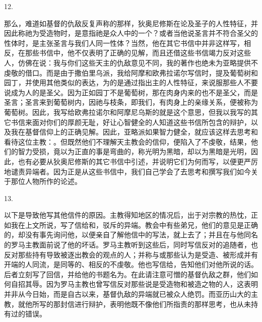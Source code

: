 12. \par

那么，难道如基督的仇敌反复声称的那样，狄奥尼修斯在论及圣子的人性特征，并因此称祂为受造物时，是意指祂是众人中的一个？或者当他说圣言并不符合圣父的性体时，是主张圣言与我们人同一性体？当然，他在其它书信中并非这样写，相反，在那些书信中，他不仅表明了正确的见解，而且还借这些书信竭力反对这些人，仿佛在说：我与你们这些天主的仇敌意见不同，我的著作也绝未为亚略提供不虔敬的借口。而是由于撒伯里乌派，我给阿摩和欧弗拉诺尔写信时，提及葡萄树和园丁，并使用其他类似的表达，为的是通过指出主的人性特征，来说服那些人不要说成为人的是圣父。因为正如园丁不是葡萄树，那在肉身内来的也不是圣父，而是圣言；圣言来到葡萄树内，因祂与枝条，即我们，有肉身上的亲缘关系，便被称为葡萄树。因此，我写给欧弗拉诺尔和阿摩尼乌斯的就是这个意思，但我以我写的其它书信来面对你们的厚颜无耻，好让心智健全的人知道这些书信所包含的辩护，以及我在基督信仰上的正确见解。因此，亚略派如果智力健全，就应该这样去思考和看待这位主教：。但既然他们不理解天主教会的信仰，便陷入了不虔敬，结果，他们的智力受损，竟以为正直的事是弯曲的，称光明为黑暗，却以为黑暗是光明，因此，也有必要从狄奥尼修斯的其它书信中引述，并说明它们为何而写，以便更严厉地谴责异端者。因为正是从这些书信中，我们自己学会了去思考和撰写我们如今关于那位人物所作的论述。\par

13. \par

以下是导致他写其他信件的原因。主教得知地区的情况后，出于对宗教的热忱，正如我在上文所说，写了信给和，驳斥的异端。教会中有些弟兄，他们的意见是正确的，却没有事先询问他，以便亲自了解他信中的写法，就上去了；并且在与他同名的罗马主教面前说了他的坏话。罗马主教听到这些后，同时写信反对的追随者，也反对那些持有导致被逐出教会的观点的人；并称与或那些认为是受造、被形成并有开端的人同流，是同等的、相反的不虔敬。他也写信给，告知他们对他所说的话。后者立刻写了回信，并给他的书题名为。在此请注意可憎的基督仇敌之群，他们如何自招其辱。因为罗马主教也曾写信反对那些说是受造物和被造之物的人，这表明并非从今日始，而是自古以来，基督仇敌的异端就已被众人绝罚。而亚历山大的主教，就他所写的那封信进行辩护，表明他既不像他们所指责的那样思考，也从未持有过的错误。\par

